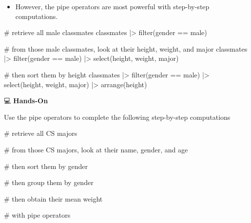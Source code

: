 \documentclass[
  letterpaper,
  DIV=11,
  numbers=noendperiod]{scrreprt}
\newenvironment{Shaded}{\begin{snugshade}}{\end{snugshade}}
\newcommand{\CommentTok}[1]{\textcolor[rgb]{0.37,0.37,0.37}{#1}}
\newcommand{\FunctionTok}[1]{\textcolor[rgb]{0.28,0.35,0.67}{#1}}
\newcommand{\NormalTok}[1]{\textcolor[rgb]{0.00,0.23,0.31}{#1}}
\newcommand{\SpecialCharTok}[1]{\textcolor[rgb]{0.37,0.37,0.37}{#1}}
\newcommand{\StringTok}[1]{\textcolor[rgb]{0.13,0.47,0.30}{#1}}
\providecommand{\tightlist}{%
  \setlength{\itemsep}{0pt}\setlength{\parskip}{0pt}}\usepackage{longtable,booktabs,array}
\begin{document}
\begin{itemize}
\tightlist
\item
  However, the pipe operators are most powerful with step-by-step
  computations.
\end{itemize}

\begin{Shaded}
\begin{Highlighting}[]
\CommentTok{\# retrieve all male classmates}
\NormalTok{classmates }\SpecialCharTok{|\textgreater{}}
  \FunctionTok{filter}\NormalTok{(gender }\SpecialCharTok{==} \StringTok{\textquotesingle{}male\textquotesingle{}}\NormalTok{)}

\CommentTok{\# from those male classmates, look at their height, weight, and major}
\NormalTok{classmates }\SpecialCharTok{|\textgreater{}}
  \FunctionTok{filter}\NormalTok{(gender }\SpecialCharTok{==} \StringTok{\textquotesingle{}male\textquotesingle{}}\NormalTok{) }\SpecialCharTok{|\textgreater{}}
  \FunctionTok{select}\NormalTok{(height, weight, major)}

\CommentTok{\# then sort them by height}
\NormalTok{classmates }\SpecialCharTok{|\textgreater{}}
  \FunctionTok{filter}\NormalTok{(gender }\SpecialCharTok{==} \StringTok{\textquotesingle{}male\textquotesingle{}}\NormalTok{) }\SpecialCharTok{|\textgreater{}}
  \FunctionTok{select}\NormalTok{(height, weight, major) }\SpecialCharTok{|\textgreater{}}
  \FunctionTok{arrange}\NormalTok{(height)}
\end{Highlighting}
\end{Shaded}

💻 \textbf{Hands-On}

Use the pipe operators to complete the following step-by-step
computations

\begin{Shaded}
\begin{Highlighting}[]
\CommentTok{\# retrieve all CS majors}


\CommentTok{\# from those CS majors, look at their name, gender, and age}


\CommentTok{\# then sort them by gender}


\CommentTok{\# then group them by gender}


\CommentTok{\# then obtain their mean weight}


\CommentTok{\# with pipe operators}
\end{Highlighting}
\end{Shaded}
\end{document}
